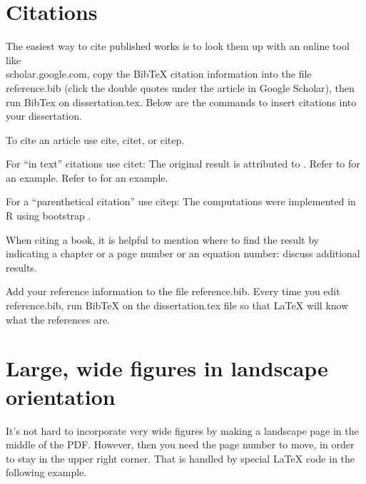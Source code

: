 \section{Citations}


The easiest way to cite published works is to look them up with an online tool like\\ scholar.google.com, copy the BibTeX citation information into the file reference.bib (click the double quotes under the article in Google Scholar), then run BibTex on dissertation.tex.
Below are the commands to insert citations into your dissertation.

To cite an article use cite, citet, or citep.

For ``in text'' citations use citet:  The original result is attributed to \citet{vn28}.
Refer to \citet{mardia70} for an example.
Refer to \cite{mardia70} for an example.

For a ``parenthetical citation'' use citep:  The computations were implemented in R \citep{R}
using bootstrap \citep{dh97,et93}.

When citing a book, it is helpful to mention where to find the result by indicating
a chapter or a page number or an equation number:  \citet[Ch.~6]{et93} discuss additional results.

Add your reference information to the file reference.bib.
Every time you edit reference.bib, run BibTeX on the dissertation.tex file so that LaTeX will know what the references are.


\section{Large, wide figures in landscape orientation}

It's not hard to incorporate very wide figures by making a landscape page in the middle of the PDF.  However, then you need the page number to move, in order to stay in the upper right corner.  That is handled by special LaTeX code in the following example.

